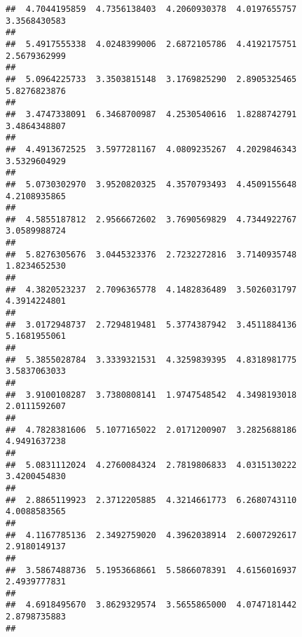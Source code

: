 \documentclass[]{article}
\begin{document}
\begin{verbatim}
##  4.7044195859  4.7356138403  4.2060930378  4.0197655757  3.3568430583 
##                                                                       
##  5.4917555338  4.0248399006  2.6872105786  4.4192175751  2.5679362999 
##                                                                       
##  5.0964225733  3.3503815148  3.1769825290  2.8905325465  5.8276823876 
##                                                                       
##  3.4747338091  6.3468700987  4.2530540616  1.8288742791  3.4864348807 
##                                                                       
##  4.4913672525  3.5977281167  4.0809235267  4.2029846343  3.5329604929 
##                                                                       
##  5.0730302970  3.9520820325  4.3570793493  4.4509155648  4.2108935865 
##                                                                       
##  4.5855187812  2.9566672602  3.7690569829  4.7344922767  3.0589988724 
##                                                                       
##  5.8276305676  3.0445323376  2.7232272816  3.7140935748  1.8234652530 
##                                                                       
##  4.3820523237  2.7096365778  4.1482836489  3.5026031797  4.3914224801 
##                                                                       
##  3.0172948737  2.7294819481  5.3774387942  3.4511884136  5.1681955061 
##                                                                       
##  5.3855028784  3.3339321531  4.3259839395  4.8318981775  3.5837063033 
##                                                                       
##  3.9100108287  3.7380808141  1.9747548542  4.3498193018  2.0111592607 
##                                                                       
##  4.7828381606  5.1077165022  2.0171200907  3.2825688186  4.9491637238 
##                                                                       
##  5.0831112024  4.2760084324  2.7819806833  4.0315130222  3.4200454830 
##                                                                       
##  2.8865119923  2.3712205885  4.3214661773  6.2680743110  4.0088583565 
##                                                                       
##  4.1167785136  2.3492759020  4.3962038914  2.6007292617  2.9180149137 
##                                                                       
##  3.5867488736  5.1953668661  5.5866078391  4.6156016937  2.4939777831 
##                                                                       
##  4.6918495670  3.8629329574  3.5655865000  4.0747181442  2.8798735883 
##                                                                       

\end{verbatim}
\end{document}

